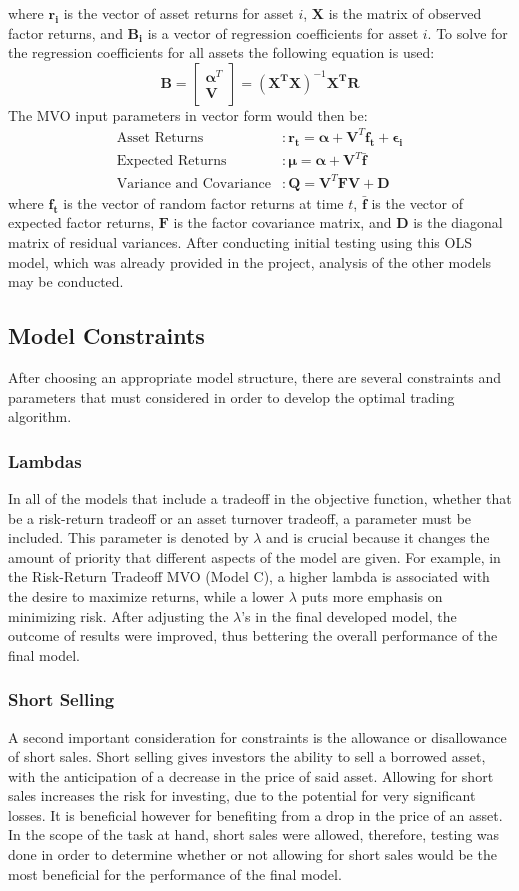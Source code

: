 \documentclass[10pt]{article}
\begin{document}
where $\bm{r_i}$ is the vector of asset returns for asset $i$,  $\bm{X}$ is the matrix of observed factor returns, and $\bm{B_i}$ is a vector of regression coefficients for asset $i$. To solve for the regression coefficients for all assets the following equation is used: \bigskip
$$\bm{B} = \begin{bmatrix}
\bm{\alpha}^T \\
\bm{V} 
\end{bmatrix} = (\bm{X^TX})^{-1}\bm{X^TR}$$
The MVO input parameters in vector form would then be:
\begin{align*}
\text{Asset Returns} &: \bm{r_t} = \bm{\alpha} + \bm{V}^T\bm{f_t} + \bm{\epsilon_i} \\
\text{Expected Returns} &: \bm{\mu} = \bm{\alpha} + \bm{V}^T\bar{\bm{f}} \\
\text{Variance and Covariance} &: \bm{Q} = \bm{V}^T\bm{F V} + \bm{D} 
\end{align*}
where $\bm{f_t}$ is the vector of random factor returns at time $t$, $\bar{\bm{f}}$ is the vector of expected factor returns, $\bm{F}$ is the factor covariance matrix, and $\bm{D}$ is the diagonal matrix of residual variances. After conducting initial testing using this OLS model, which was already provided in the project, analysis of the other models may be conducted.
\subsection{Model Constraints}
After choosing an appropriate model structure, there are several constraints and parameters that must considered in order to develop the optimal trading algorithm. 
\subsubsection{Lambdas}
In all of the models that include a tradeoff in the objective function, whether that be a risk-return tradeoff or an asset turnover tradeoff, a parameter must be included. This parameter is denoted by $\lambda$ and is crucial because it changes the amount of priority that different aspects of the model are given. For example, in the Risk-Return Tradeoff MVO (Model C), a higher lambda is associated with the desire to maximize returns, while a lower $\lambda$ puts more emphasis on minimizing risk. After adjusting the $\lambda$'s in the final developed model, the outcome of results were improved, thus bettering the overall performance of the final model. 
\subsubsection{Short Selling}
A second important consideration for constraints is the allowance or disallowance of short sales. Short selling gives investors the ability to sell a borrowed asset, with the anticipation of a decrease in the price of said asset. Allowing for short sales increases the risk for investing, due to the potential for very significant losses. It is beneficial however for benefiting from a drop in the price of an asset. In the scope of the task at hand, short sales were allowed, therefore, testing was done in order to determine whether or not allowing for short sales would be the most beneficial for the performance of the final model. 
\end{document}
